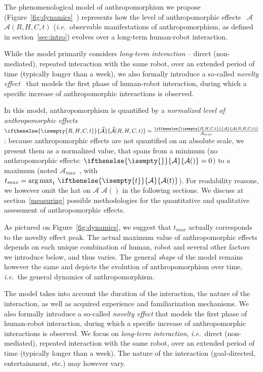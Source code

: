 \documentclass{frontiersSCNS} %
\newcommand{\ie}{{\textit{i.e.~}}}
\newcommand{\Ant}[1][]{%
      \ifthenelse{\isempty{#1}}%
        {$\mathcal{A}$}
        {$\mathcal{A}(#1)$}
}
\newcommand{\ant}[1][]{%
      \ifthenelse{\isempty{#1}}%
        {\mathcal{A}}
        {\mathcal{A}(#1)}
}
\newcommand{\antNorm}[1][]{%
      \ifthenelse{\isempty{#1}}%
      {\widehat{\mathcal{A}}}
      {\widehat{\mathcal{A}}(#1)}
}
\newcommand{\AntMax}{{$\mathcal{A}_{max}$~}}
\newcommand{\antMax}{{\mathcal{A}_{max}}}
\begin{document}
The phenomenological model of anthropomorphism we propose
(Figure~\ref{fig:dynamics}~\citep{lemaignan2014dynamics}) represents how the
level of anthropomorphic effects~\Ant[R,H,C,t] (\ie observable manifestations of
anthropomorphism, as defined in section~\ref{sec:intro}) evolves over a
long-term human-robot interaction.

While the model primarily considers \emph{long-term interaction} -- direct
(non-mediated), repeated interaction with the same robot, over an extended
period of time (typically longer than a week), we also formally introduce a
so-called \emph{novelty effect}~\citep{kanda_interactive_2004} that models the
first phase of human-robot interaction, during which a specific increase of
anthropomorphic interactions is observed.

In this model, anthropomorphism is quantified by a \emph{normalized level of
anthropomorphic effects} $\antNorm[R,H,C,t] = \frac{\ant[R,H,C,t]}{\antMax}$: because anthropomorphic effects are
not quantified on an absolute scale, we present them as a normalized value, that
spans from a minimum (no anthropomorphic effects: $\ant=0$) to a maximum (noted
\AntMax, with $t_{max} = \operatorname{arg\,max}_t \, \ant[t]$). For readability
reasons, we however omit the hat on \Ant in the following sections. We discuss
at section~\ref{measuring} possible methodologies for the quantitative and
qualitative assessment of anthropomorphic effects.

As pictured on Figure~\ref{fig:dynamics}, we suggest that $t_{max}$ actually
corresponds to the novelty effect peak. The actual maximum value of
anthropomorphic effects depends on each unique combination of human, robot and
several other factors we introduce below, and thus varies. The general
\emph{shape} of the model remains however the same and depicts the evolution of
anthropomorphism over time, \ie the general dynamics of anthropomorphism.

The model takes into account the duration of the interaction, the nature of the
interaction, as well as acquired experience and familiarization mechanisms. We
also formally introduce a so-called \emph{novelty effect} that models the first
phase of human-robot interaction, during which a specific increase of
anthropomorphic interactions is observed. We focus on \emph{long-term
interaction}, \ie direct (non-mediated), repeated interaction with the same
robot, over an extended period of time (typically longer than a week). The nature 
of the interaction (goal-directed, entertainment, etc.) may
however vary.
\end{document}
